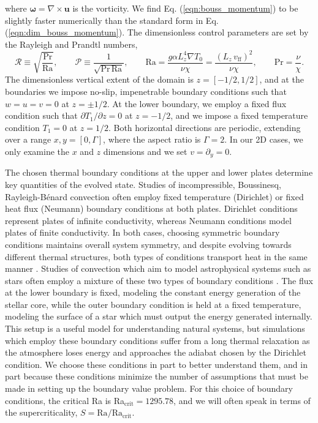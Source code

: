 \documentclass[aps, pre, onecolumn, nofootinbib, notitlepage, groupedaddress, amsfonts, amssymb, amsmath, longbibliography]{revtex4-1}
\newcommand{\grad}{\ensuremath{\nabla}}
\newcommand{\RB}{Rayleigh-B\'{e}nard }
\begin{document}
where $\bm{\omega} = \grad \times \bm{u}$ is the vorticity. We find Eq. (\ref{eqn:bouss_momentum}) to
be slightly faster numerically than the standard form in Eq. (\ref{eqn:dim_bouss_momentum}).
The dimensionless control parameters are set by the Rayleigh and Prandtl numbers,
\begin{equation}
\mathcal{R} \equiv \sqrt{\frac{\text{Pr}}{\text{Ra}}}, \qquad \mathcal{P} \equiv \frac{1}{\sqrt{\text{Pr}\,\text{Ra}}}, \qquad
\text{Ra} = \frac{g \alpha L_z^4 \grad T_0}{\nu\chi} = \frac{(L_z\,v_{\text{ff}})^2}{\nu\chi}, \qquad \text{Pr} = \frac{\nu}{\chi}.
\end{equation}
The dimensionless vertical extent of the domain is $z = [-1/2, 1/2]$, and at the boundaries
we impose no-slip, impenetrable boundary conditions such that $w = u = v = 0$ at $z = \pm 1/2$.
At the lower boundary, we employ a fixed flux condition such that $\partial T_1 / \partial z = 0$
at $z = -1/2$, and we impose a fixed temperature condition $T_1 = 0$ at $z = 1/2$. Both
horizontal directions are periodic, extending over a range $x, y = [0, \Gamma]$, where
the aspect ratio is $\Gamma = 2$. In our 2D cases, we only examine the $x$ and $z$ dimensions
and we set $v = \partial_y = 0$.

The chosen thermal boundary conditions at the upper and lower plates
determine key quantities of the evolved state.
Studies of incompressible, Boussinesq, \RB convection often
employ fixed temperature (Dirichlet) or fixed heat flux
(Neumann) boundary conditions at both plates.  
Dirichlet conditions represent plates of infinite conductivity,
whereas Neumann conditions model plates of finite conductivity.  
In both cases, choosing symmetric boundary conditions maintains overall system symmetry, 
and despite evolving towards different thermal structures, both types of conditions
transport heat in the same manner \cite{johnston&doering2009}.
Studies of convection which aim to model
astrophysical systems such as stars often employ a mixture of these
two types of boundary conditions \cite{hurlburt&all1984, cattaneo&all1991, korre&all2017}.  
The flux at the lower boundary is fixed, modeling
the constant energy generation of the stellar core, 
while the outer boundary condition is held at a fixed temperature,
modeling the surface of a star which must output the energy generated internally.
This setup is a useful model for understanding natural
systems, but simulations which employ these boundary conditions suffer from a long 
thermal relaxation as the atmosphere loses energy and approaches the adiabat chosen by the
Dirichlet condition.  We choose these conditions in part to better understand them, and in
part because these conditions minimize the number of assumptions that must be made in
setting up the boundary value problem.  For this choice of boundary conditions, the
critical Ra is Ra$_{\text{crit}} = 1295.78$, and we will often speak in terms of the
supercriticality, $S = \text{Ra}/\text{Ra}_{\text{crit}}$.
\end{document}

